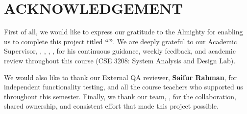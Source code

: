 \chapter*{ACKNOWLEDGEMENT}
\thispagestyle{empty}

First of all, we would like to express our gratitude to the Almighty for enabling us to complete this project titled \textbf{``\reporttitle''}. We are deeply grateful to our Academic Supervisor, \textbf{\supervisorname}, \supervisortitle, \supervisordept, \uniname, for his continuous guidance, weekly feedback, and academic review throughout this course (CSE 3208: System Analysis and Design Lab).

We would also like to thank our External QA reviewer, \textbf{Saifur Rahman}, for independent functionality testing, and all the course teachers who supported us throughout this semester. Finally, we thank our team, \textbf{\teamname}, for the collaboration, shared ownership, and consistent effort that made this project possible.

\vspace{1cm}
\hfill \teamname
\clearpage
